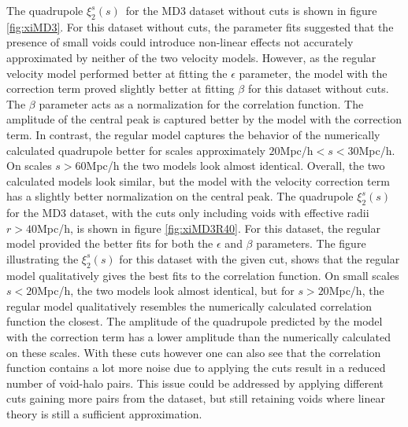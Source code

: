 The quadrupole $\xi_2^s(s)$ for the MD3 dataset without cuts is shown in figure \ref{fig:xiMD3}. For this dataset without cuts, the parameter fits suggested that the presence of small voids could introduce non-linear effects not accurately approximated by neither of the two velocity models. However, as the regular velocity model performed better at fitting the $\epsilon$ parameter, the model with the correction term proved slightly better at fitting $\beta$ for this dataset without cuts. The $\beta$ parameter acts as a normalization for the correlation function. The amplitude of the central peak is captured better by the model with the correction term. In contrast, the regular model captures the behavior of the numerically calculated quadrupole better for scales approximately $20$Mpc/h$<s<30$Mpc/h. On scales $s>60$Mpc/h the two models look almost identical. Overall, the two calculated models look similar, but the model with the velocity correction term has a slightly better normalization on the central peak. The quadrupole $\xi_2^s(s)$ for the MD3 dataset, with the cuts only including voids with effective radii $r>40$Mpc/h, is shown in figure \ref{fig:xiMD3R40}. For this dataset, the regular model provided the better fits for both the $\epsilon$ and $\beta$ parameters. The figure illustrating the $\xi_2^s(s)$ for this dataset with the given cut, shows that the regular model qualitatively gives the best fits to the correlation function. On small scales $s<20$Mpc/h, the two models look almost identical, but for $s>20$Mpc/h, the regular model qualitatively resembles the numerically calculated correlation function the closest. The amplitude of the quadrupole predicted by the model with the correction term has a lower amplitude than the numerically calculated on these scales. With these cuts however one can also see that the correlation function contains a lot more noise due to applying the cuts result in a reduced number of void-halo pairs. This issue could be addressed by applying different cuts gaining more pairs from the dataset, but still retaining voids where linear theory is still a sufficient approximation.\\\indent
